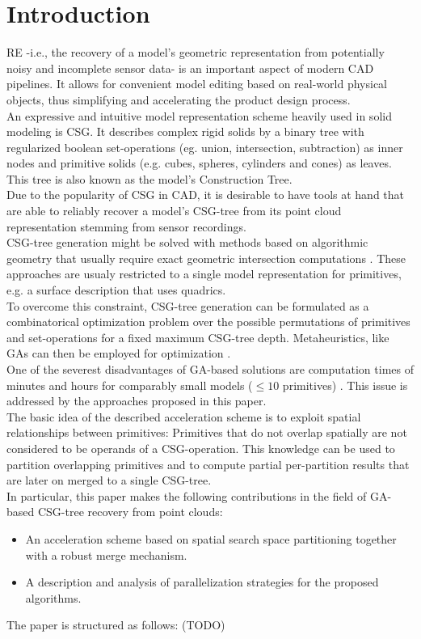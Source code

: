 \section{Introduction}
\ac{RE} -i.e., the recovery of a model's geometric representation from potentially noisy and incomplete sensor data- is an important aspect of modern \ac{CAD} pipelines. 
It allows for convenient model editing based on real-world physical objects, thus simplifying and accelerating the product design process.
\\
An expressive and intuitive model representation scheme heavily used in solid modeling is \ac{CSG}.
It describes complex rigid solids by a binary tree with regularized boolean set-operations (eg. union, intersection, subtraction) as inner nodes and primitive solids (e.g. cubes, spheres, cylinders and cones) as leaves. 
This tree is also known as the model's Construction Tree.
\\
Due to the popularity of \ac{CSG} in \ac{CAD}, it is desirable to have tools at hand that are able to reliably recover a model's \ac{CSG}-tree from its point cloud representation stemming from sensor recordings.
\\
\ac{CSG}-tree generation might be solved with methods based on algorithmic geometry that usually require exact geometric intersection computations \cite{shapiro1993separation, buchele2004three}. 
These approaches are usualy restricted to a single model representation for primitives, e.g. a surface description that uses quadrics. 
\\  
To overcome this constraint, \ac{CSG}-tree generation can be formulated as a combinatorical optimization problem over the possible permutations of primitives and set-operations for a fixed maximum \ac{CSG}-tree depth.
Metaheuristics, like \acp{GA} can then be employed for optimization \cite{mitchell1998introduction}.
\\
One of the severest disadvantages of \ac{GA}-based solutions are computation times of minutes and hours for comparably small models ($\le 10$ primitives) \cite{fayolle2016evolutionary}.
This issue is addressed by the approaches proposed in this paper.  
\\
The basic idea of the described acceleration scheme is to exploit spatial relationships between primitives: 
Primitives that do not overlap spatially are not considered to be operands of a \ac{CSG}-operation.
This knowledge can be used to partition overlapping primitives and to compute partial per-partition results that are later on merged to a single \ac{CSG}-tree. 
\\
In particular, this paper makes the following contributions in the field of \ac{GA}-based \ac{CSG}-tree recovery from point clouds: 
\begin{itemize}
\item An acceleration scheme based on spatial search space partitioning together with a robust merge mechanism.
\item A description and analysis of parallelization strategies for the proposed algorithms.
\end{itemize}  
The paper is structured as follows: (TODO)
\copyrightspace
